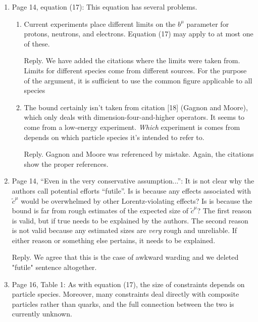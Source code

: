 \documentclass[12pt,preprintnumbers,nofootinbib]{revtex4}
\begin{document}
\begin{enumerate}
\item Page 14, equation (17):
 This equation has several problems.
 \begin{enumerate}
 \item Current experiments place different limits on the $b^\mu$ parameter
 for protons, neutrons, and electrons.
 Equation (17) may apply to at most one of these.

Reply.
	We have added the citations where the limits were taken from.
	Limits for different species come from different sources.
	For the purpose of the argument, it is sufficient to use the
	common figure applicable to all species

 \item The bound certainly isn't taken from citation [18] (Gagnon and Moore),
 which only deals with dimension-four-and-higher operators.
 It seems to come from a low-energy experiment.
 {\itshape Which} experiment is comes from depends on which particle species
 it's intended to refer to.

Reply.
	Gagnon and Moore was referenced by mistake. Again, the citations
	show the proper references.
 \end{enumerate}

\item Page 14, ``Even in the very conservative assumption...'':
 It is not clear why the authors call potential efforts ``futile''.
 Is is because any effects associated with $\tilde{c}^\mu$ would be overwhelmed
 by other Lorentz-violating effects?
 Is is because the bound is far from rough estimates of the expected size of
$\tilde{c}^\mu$?
 The first reason is valid, but if true needs to be explained by the authors.
 The second reason is not valid because any estimated sizes are {\itshape very}
rough and unreliable.
 If either reason or something else pertains, it needs to be explained.

Reply. 
We agree that this is the case of awkward warding and we deleted "futile" 
sentence altogether. 


\item Page 16, Table 1:
 As with equation (17), the size of constraints depends on particle species.
 Moreover, many constraints deal directly with composite particles
 rather than quarks,
 and the full connection between the two is currently unknown.


\end{enumerate}
\end{document}
